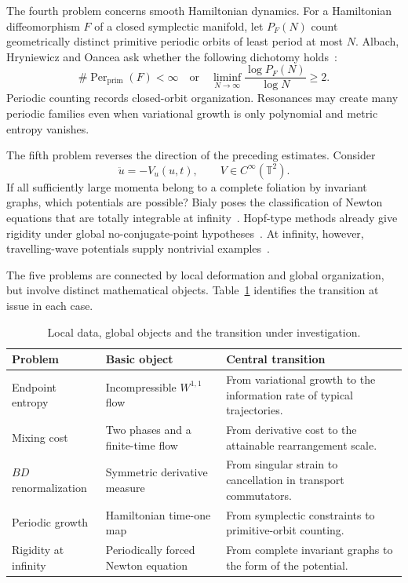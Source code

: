 \documentclass[review,12pt,times,a4paper,nopreprintline]{elsarticle}
\theoremstyle{plain}
\theoremstyle{definition}
\theoremstyle{remark}
\newcommand{\T}{\mathbb T}
\numberwithin{equation}{section}
\begin{document}
The fourth problem concerns smooth Hamiltonian dynamics. For a Hamiltonian diffeomorphism $F$ of a closed symplectic manifold, let $P_F(N)$ count geometrically distinct primitive periodic orbits of least period at most $N$. Albach, Hryniewicz and Oancea ask whether the following dichotomy holds~\cite{OpenProblems2026}:
\begin{equation}\label{eq:introperiods}
 \#\operatorname{Per}_{\mathrm{prim}}(F)<\infty
 \quad\text{or}\quad
 \liminf_{N\to\infty}\frac{\log P_F(N)}{\log N}\geq2.
\end{equation}
Periodic counting records closed-orbit organization. Resonances may create many periodic families even when variational growth is only polynomial and metric entropy vanishes.

The fifth problem reverses the direction of the preceding estimates. Consider
\begin{equation}\label{eq:intronewton}
 \ddot u=-V_u(u,t),\qquad V\in C^\infty(\T^2).
\end{equation}
If all sufficiently large momenta belong to a complete foliation by invariant graphs, which potentials are possible? Bialy poses the classification of Newton equations that are totally integrable at infinity~\cite{OpenProblems2026}. Hopf-type methods already give rigidity under global no-conjugate-point hypotheses~\cite{BialyPolterovich}. At infinity, however, travelling-wave potentials supply nontrivial examples~\cite{BialyInfinity}.

The five problems are connected by local deformation and global organization, but involve distinct mathematical objects. Table~\ref{tab:panorama} identifies the transition at issue in each case.
\begin{table}[tb]
\centering\small
\caption{Local data, global objects and the transition under investigation.}\label{tab:panorama}
\begin{tabularx}{\textwidth}{@{}>{\raggedright\arraybackslash}p{}>{\raggedright\arraybackslash}p{}>{\raggedright\arraybackslash}X@{}}
\toprule
Problem & Basic object & Central transition\\
\midrule
Endpoint entropy & Incompressible $W^{1,1}$ flow & From variational growth to the information rate of typical trajectories.\\[4pt]
Mixing cost & Two phases and a finite-time flow & From derivative cost to the attainable rearrangement scale.\\[4pt]
$BD$ renormalization & Symmetric derivative measure & From singular strain to cancellation in transport commutators.\\[4pt]
Periodic growth & Hamiltonian time-one map & From symplectic constraints to primitive-orbit counting.\\[4pt]
Rigidity at infinity & Periodically forced Newton equation & From complete invariant graphs to the form of the potential.\\
\bottomrule
\end{tabularx}
\end{table}
\end{document}
